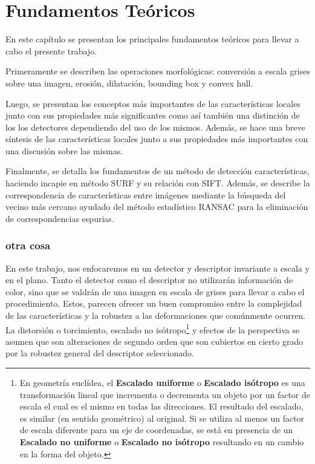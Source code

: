 \chapter{Fundamentos Teóricos}
\label{c:fundamentosteoricos}

\vspace{1cm}

En este capítulo se presentan los principales fundamentos teóricos para llevar a cabo el presente trabajo.

Primeramente se describen las operaciones morfológicas: conversión a escala grises sobre una imagen, erosión, dilatación, bounding box y convex hull.

Luego, se presentan los conceptos más importantes de las características locales junto con sus propiedades más significantes como así también una distinción de los los detectores dependiendo del uso de los mismos. Además, se hace una breve síntesis de las características locales junto a sus propiedades más importantes con una discusión sobre las mismas.

Finalmente, se detalla los fundamentos de un método de detección características, haciendo incapie en método SURF y su relación con SIFT. Además, se describe la correspondencia de características entre imágenes mediante  la búsqueda del vecino más cercano ayudado del método estadístico RANSAC para la eliminación de correspondencias espurias.

\newpage

\subsection{otra cosa}
      En este trabajo, nos enfocaremos en un detector y descriptor invariante a escala y en el plano. Tanto el detector como el descriptor no utilizarán información de color, sino que se valdrán de una imagen en escala de grises para llevar a cabo el procedimiento. Estos, parecen ofrecer un buen compromiso entre la complejidad de las características y la robustez a las deformaciones que comúnmente ocurren. La distorsión o torcimiento, escalado no isótropo\footnote{En geometría euclídea, el \textbf{Escalado uniforme} o \textbf{Escalado isótropo} es una transformación lineal que incrementa o decrementa un objeto por un factor de escala el cual es el mismo en todas las direcciones. El resultado del escalado, es similar (en sentido geométrico) al original. Si se utiliza al menos un factor de escala diferente para un eje de coordenadas, se está en presencia de un \textbf{Escalado no uniforme} o \textbf{Escalado no isótropo} resultando en un cambio en la forma del objeto.} y efectos de la perspectiva se asumen que son alteraciones de segundo orden que son cubiertos en cierto grado por la robustez general del descriptor seleccionado.

